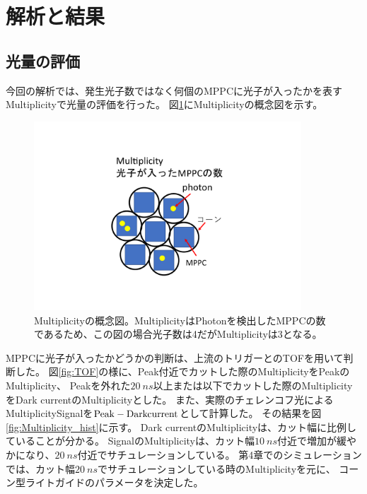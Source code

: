 \section{解析と結果}

\subsection{光量の評価}
今回の解析では、発生光子数ではなく何個のMPPCに光子が入ったかを表すMultiplicityで光量の評価を行った。
図\ref{fig:Multiplicity}にMultiplicityの概念図を示す。

\begin{figure}[htbp]
  \centering
  \includegraphics[width=10cm]{images/chapter3/Multiplicity.pdf}
  \caption{Multiplicityの概念図。MultiplicityはPhotonを検出したMPPCの数であるため、この図の場合光子数は4だがMultiplicityは3となる。}
  \label{fig:Multiplicity}
\end{figure}

MPPCに光子が入ったかどうかの判断は、上流のトリガーとのTOFを用いて判断した。
図\ref{fig:TOF}の様に、Peak付近でカットした際のMultiplicityをPeakのMultiplicity、
Peakを外れた$\SI{20}{ns}$以上または以下でカットした際のMultiplicityをDark currentのMultiplicityとした。
また、実際のチェレンコフ光によるMultiplicitySignalを$\rm{Peak} - \rm{Dark current}$として計算した。
その結果を図\ref{fig:Multiplicity_hist}に示す。
Dark currentのMultiplicityは、カット幅に比例していることが分かる。
SignalのMultiplicityは、カット幅$\SI{10}{ns}$付近で増加が緩やかになり、$\SI{20}{ns}$付近でサチュレーションしている。
第4章でのシミュレーションでは、カット幅$\SI{20}{ns}$でサチュレーションしている時のMultiplicityを元に、
コーン型ライトガイドのパラメータを決定した。

